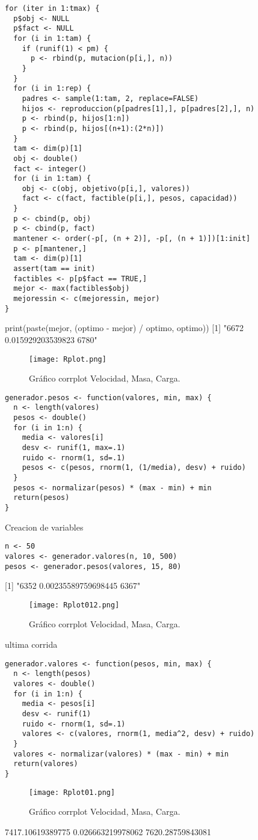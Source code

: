 \documentclass[10pt,a4paper]{article}
\begin{document}
\begin{multicols}{2}
\begin{lstlisting}
for (iter in 1:tmax) {
  p$obj <- NULL
  p$fact <- NULL
  for (i in 1:tam) {
    if (runif(1) < pm) {
      p <- rbind(p, mutacion(p[i,], n))
    }
  }
  for (i in 1:rep) { 
    padres <- sample(1:tam, 2, replace=FALSE)
    hijos <- reproduccion(p[padres[1],], p[padres[2],], n)
    p <- rbind(p, hijos[1:n])
    p <- rbind(p, hijos[(n+1):(2*n)]) 
  }
  tam <- dim(p)[1]
  obj <- double()
  fact <- integer()
  for (i in 1:tam) {
    obj <- c(obj, objetivo(p[i,], valores))
    fact <- c(fact, factible(p[i,], pesos, capacidad))
  }
  p <- cbind(p, obj)
  p <- cbind(p, fact)
  mantener <- order(-p[, (n + 2)], -p[, (n + 1)])[1:init]
  p <- p[mantener,]
  tam <- dim(p)[1]
  assert(tam == init)
  factibles <- p[p$fact == TRUE,]
  mejor <- max(factibles$obj)
  mejoressin <- c(mejoressin, mejor)
}
\end{lstlisting}

print(paste(mejor, (optimo - mejor) / optimo, optimo))
[1] "6672 0.015929203539823 6780" 

	\begin{figure}[H]
				\centering
				\texttt{[image: Rplot.png]}
				\caption{Gráfico corrplot Velocidad, Masa, Carga.}
				\label{fig: Figura1}
			\end{figure}

\begin{lstlisting}
generador.pesos <- function(valores, min, max) {
  n <- length(valores)
  pesos <- double()
  for (i in 1:n) {
    media <- valores[i]
    desv <- runif(1, max=.1)
    ruido <- rnorm(1, sd=.1)
    pesos <- c(pesos, rnorm(1, (1/media), desv) + ruido)
  }
  pesos <- normalizar(pesos) * (max - min) + min
  return(pesos)
}
\end{lstlisting}
Creacion de variables
\begin{lstlisting}
n <- 50
valores <- generador.valores(n, 10, 500)
pesos <- generador.pesos(valores, 15, 80)
\end{lstlisting}
[1] "6352 0.00235589759698445 6367"
\begin{figure}[H]
				\centering
				\texttt{[image: Rplot012.png]}
				\caption{Gráfico corrplot Velocidad, Masa, Carga.}
				\label{fig: Figura1}
\end{figure}
ultima corrida
\begin{lstlisting}
generador.valores <- function(pesos, min, max) {
  n <- length(pesos)
  valores <- double()
  for (i in 1:n) {
    media <- pesos[i]
    desv <- runif(1)
    ruido <- rnorm(1, sd=.1)
    valores <- c(valores, rnorm(1, media^2, desv) + ruido)
  }
  valores <- normalizar(valores) * (max - min) + min
  return(valores)
}
\end{lstlisting}
\begin{figure}[H]
				\centering
				\texttt{[image: Rplot01.png]}
				\caption{Gráfico corrplot Velocidad, Masa, Carga.}
				\label{fig: Figura1}
\end{figure}
7417.10619389775 0.026663219978062 7620.28759843081

\end{multicols}
\end{document}
